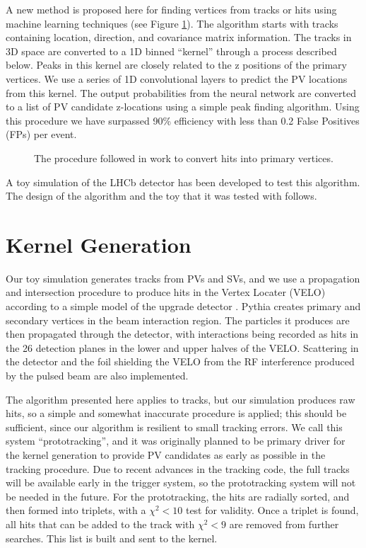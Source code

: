 \documentclass[a4paper]{jpconf}
\begin{document}
A new method is proposed here for finding vertices from tracks or hits using machine learning techniques (see Figure \ref{fig:approach}). The algorithm starts with tracks containing location, direction, and covariance matrix information. The tracks in 3D space are converted to a 1D binned ``kernel'' through a process described below. Peaks in this kernel are closely related to the z positions of the primary vertices. We use a series of 1D convolutional layers to predict the PV locations from this kernel. The output probabilities from the neural network are converted to a list of PV candidate z-locations using a simple peak finding algorithm. Using this procedure we have surpassed 90\% efficiency with less than 0.2 False Positives (FPs) per event.


\begin{figure}
	\centering
	
	\caption{The procedure followed in work to convert hits into primary vertices.}
	\label{fig:approach}
\end{figure}

A toy simulation of the LHCb detector has been developed to test this algorithm. The design of the algorithm and the toy that it was tested with follows.

\section{Kernel Generation}

Our toy simulation generates tracks from PVs and SVs, and we use a propagation and intersection procedure to produce hits in the Vertex Locater (VELO) according to a simple model of the upgrade detector \cite{Collaboration:1624070}. Pythia \cite{Sjostrand:2006za, Sjostrand:2007gs} creates primary and secondary vertices in the beam interaction region. The particles it produces are then propagated through the detector, with interactions being recorded as hits in the 26 detection planes in the lower and upper halves of the VELO. Scattering in the detector and the foil shielding the VELO from the RF interference produced by the pulsed beam \cite{Collaboration:1624070} are also implemented.

The algorithm presented here applies to tracks, but our simulation produces raw hits, so a simple and somewhat inaccurate procedure is applied; this should be sufficient, since our algorithm is resilient to small tracking errors. We call this system ``prototracking'', and it was originally planned to be primary driver for the kernel generation to provide PV candidates as early as possible in the tracking procedure. Due to recent advances in the tracking code, the full tracks will be available early in the trigger system, so the prototracking system will not be needed in the future. For the prototracking, the hits are radially sorted, and then formed into triplets, with a $\chi^2 < 10$ test for validity. Once a triplet is found, all hits that can be added to the track with $\chi^2<9$ are removed from further searches. This list is built and sent to the kernel.
\end{document}
